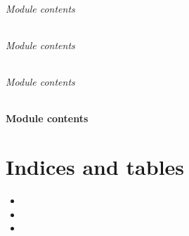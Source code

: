 \documentclass[letterpaper,10pt,english]{sphinxmanual}
\begin{document}
\subparagraph{Module contents}
\label{\detokenize{apidoc/src.osm_configurator.view.utilityframes:module-src.osm_configurator.view.utilityframes}}\label{\detokenize{apidoc/src.osm_configurator.view.utilityframes:module-contents}}

\subparagraph{Module contents}
\label{\detokenize{apidoc/src.osm_configurator.view:module-src.osm_configurator.view}}\label{\detokenize{apidoc/src.osm_configurator.view:module-contents}}

\subparagraph{Module contents}
\label{\detokenize{apidoc/src.osm_configurator:module-src.osm_configurator}}\label{\detokenize{apidoc/src.osm_configurator:module-contents}}

\subsubsection{Module contents}
\label{\detokenize{apidoc/src:module-src}}\label{\detokenize{apidoc/src:module-contents}}

\chapter{Indices and tables}
\label{\detokenize{index:indices-and-tables}}\begin{itemize}
\item {} 
\sphinxAtStartPar
{}

\item {} 
\sphinxAtStartPar
{}

\item {} 
\sphinxAtStartPar
{}

\end{itemize}
\end{document}

